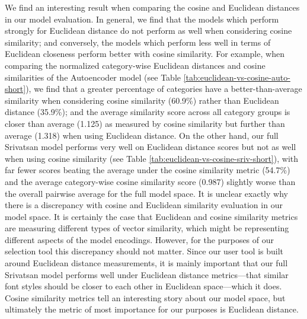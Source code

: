 We find an interesting result when comparing the cosine and Euclidean distances in our model evaluation. In general, we find that the models which perform strongly for Euclidean distance do not perform as well when considering cosine similarity; and conversely, the models which perform less well in terms of Euclidean closeness perform better with cosine similarity. For example, when comparing the normalized category-wise Euclidean distances and cosine similarities of the Autoencoder model (see Table \ref{tab:euclidean-vs-cosine-auto-short}), we find that a greater percentage of categories have a better-than-average similarity when considering cosine similarity (60.9\%) rather than Euclidean distance (35.9\%); and the average similarity score across all category groups is closer than average (1.125) as measured by cosine similarity but further than average (1.318) when using Euclidean distance. On the other hand, our full Srivatsan model performs very well on Euclidean distance scores but not as well when using cosine similarity (see Table \ref{tab:euclidean-vs-cosine-sriv-short}), with far fewer scores beating the average under the cosine similarity metric (54.7\%) and the average category-wise cosine similarity score (0.987) slightly worse than the overall pairwise average for the full model space. It is unclear exactly why there is a discrepancy with cosine and Euclidean similarity evaluation in our model space. It is certainly the case that Euclidean and cosine similarity metrics are measuring different types of vector similarity, which might be representing different aspects of the model encodings. However, for the purposes of our selection tool this discrepancy should not matter. Since our user tool is built around Euclidean distance measurements, it is mainly important that our full Srivatsan model performs well under Euclidean distance metrics---that similar font styles should be closer to each other in Euclidean space---which it does. Cosine similarity metrics tell an interesting story about our model space, but ultimately the metric of most importance for our purposes is Euclidean distance.

